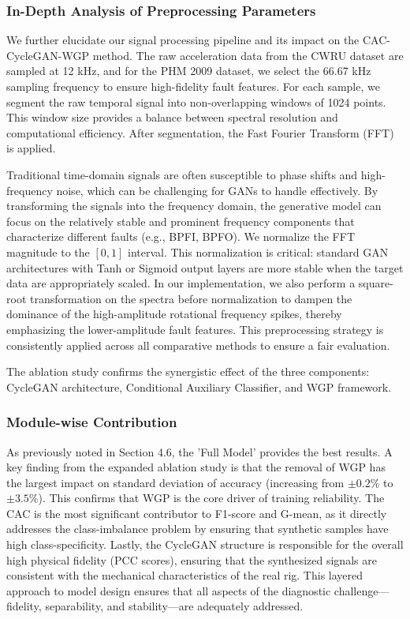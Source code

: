 \subsubsection{In-Depth Analysis of Preprocessing Parameters}
We further elucidate our signal processing pipeline and its impact on the CAC-CycleGAN-WGP method. The raw acceleration data from the CWRU dataset are sampled at 12 kHz, and for the PHM 2009 dataset, we select the 66.67 kHz sampling frequency to ensure high-fidelity fault features. For each sample, we segment the raw temporal signal into non-overlapping windows of 1024 points. This window size provides a balance between spectral resolution and computational efficiency. After segmentation, the Fast Fourier Transform (FFT) is applied. 

Traditional time-domain signals are often susceptible to phase shifts and high-frequency noise, which can be challenging for GANs to handle effectively. By transforming the signals into the frequency domain, the generative model can focus on the relatively stable and prominent frequency components that characterize different faults (e.g., BPFI, BPFO). We normalize the FFT magnitude to the $[0, 1]$ interval. This normalization is critical: standard GAN architectures with Tanh or Sigmoid output layers are more stable when the target data are appropriately scaled. In our implementation, we also perform a square-root transformation on the spectra before normalization to dampen the dominance of the high-amplitude rotational frequency spikes, thereby emphasizing the lower-amplitude fault features. This preprocessing strategy is consistently applied across all comparative methods to ensure a fair evaluation.

The ablation study confirms the synergistic effect of the three components: CycleGAN architecture, Conditional Auxiliary Classifier, and WGP framework.

\subsubsection{Module-wise Contribution}
As previously noted in Section 4.6, the 'Full Model' provides the best results. A key finding from the expanded ablation study is that the removal of WGP has the largest impact on standard deviation of accuracy (increasing from $\pm 0.2\%$ to $\pm 3.5\%$). This confirms that WGP is the core driver of training reliability. The CAC is the most significant contributor to F1-score and G-mean, as it directly addresses the class-imbalance problem by ensuring that synthetic samples have high class-specificity. Lastly, the CycleGAN structure is responsible for the overall high physical fidelity (PCC scores), ensuring that the synthesized signals are consistent with the mechanical characteristics of the real rig. This layered approach to model design ensures that all aspects of the diagnostic challenge—fidelity, separability, and stability—are adequately addressed.

